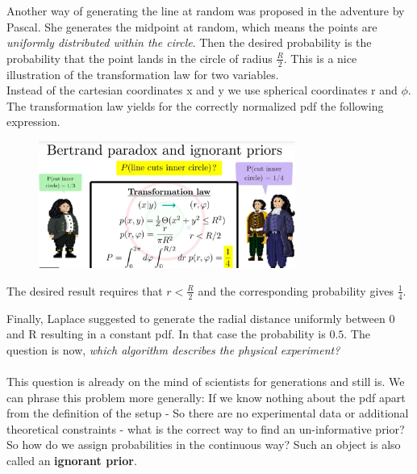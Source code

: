 \documentclass[12pt, a4paper]{scrartcl}
\begin{document}
Another way of generating the line at random was proposed in the adventure
by Pascal. She generates the midpoint at random, which means the points
are \textit{uniformly distributed within the circle}. Then the desired probability is
the probability that the point lands in the circle of radius $\frac R2$. This is a nice
illustration of the transformation law for two variables.\\
Instead of the cartesian coordinates x and y we use spherical coordinates r and $\phi$. The transformation law yields for the correctly normalized pdf the following expression. %
 \begin{figure}[H]
	\centering
	\includegraphics[width=0.75\textwidth]{8_7.png}
\end{figure}
The desired result requires that $r<\frac R2$ and the corresponding probability gives $\frac 14$.

Finally, Laplace suggested to generate the radial distance uniformly between 0 and R resulting in a constant pdf. In that case the probability is $0.5$. 
The question is now, \textit{which algorithm describes the physical experiment?}\\

\\

This question is already on the mind of scientists for generations and still is.
We can phrase this problem more generally: If we know nothing about the
pdf apart from the deﬁnition of the setup - So there are no experimental
data or additional theoretical constraints - what is the correct way to ﬁnd an
un-informative prior? So how do we assign probabilities in the continuous way?
Such an object is also called an \textbf{ignorant prior}.\\
\end{document}
